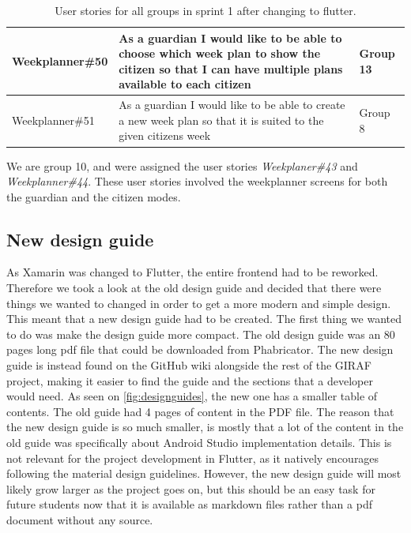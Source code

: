 \begin{table}[H]
\begin{tabular}{|p{2.8cm}|p{8cm}|p{1.6cm}|}
    Weekplanner\#50 & As a guardian I would like to be able to choose which week plan to show the citizen so that I can have multiple plans available to each citizen & Group 13             \\ \hline
    Weekplanner\#51 & As a guardian I would like to be able to create a new week plan so that it is suited to the given citizens week & Group 8             \\ \hline
    \end{tabular}
    \caption{User stories for all groups in sprint 1 after changing to flutter.}\label{table:user-stories-sprint-1}
\end{table}
\noindent
We are group 10, and were assigned the user stories \textit{Weekplaner\#43} and \textit{Weekplanner\#44}.
These user stories involved the weekplanner screens for both the guardian and the citizen modes.

\subsection{New design guide}
As Xamarin was changed to Flutter, the entire frontend had to be reworked. 
Therefore we took a look at the old design guide and decided that there were things we wanted to changed in order to get a more modern and simple design.
This meant that a new design guide had to be created.
The first thing we wanted to do was make the design guide more compact.
The old design guide was an 80 pages long pdf file that could be downloaded from Phabricator.
The new design guide is instead found on the GitHub wiki alongside the rest of the GIRAF project, making it easier to find the guide and the sections that a developer would need.
As seen on \autoref{fig:designguides}, the new one has a smaller table of contents.
The old guide had 4 pages of content in the PDF file.
The reason that the new design guide is so much smaller, is mostly that a lot of the content in the old guide was specifically about Android Studio implementation details.
This is not relevant for the project development in Flutter, as it natively encourages following the material design guidelines.
However, the new design guide will most likely grow larger as the project goes on, but this should be an easy task for future students now that it is available as markdown files rather than a pdf document without any source. 

